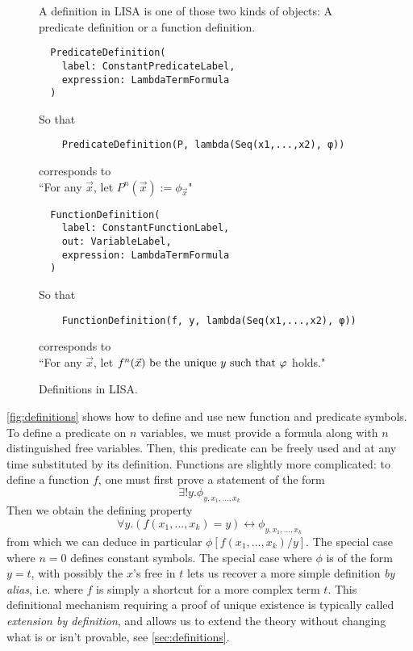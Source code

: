 \begin{figure}
  A definition in LISA is one of those two kinds of objects: A predicate definition or a function definition.
  \begin{lstlisting}
  PredicateDefinition(
    label: ConstantPredicateLabel,
    expression: LambdaTermFormula
  )
\end{lstlisting}
  So that
  \begin{lstlisting}
    PredicateDefinition(P, lambda(Seq(x1,...,x2), φ)) 
  \end{lstlisting}
  corresponds to \\
  \hspace*{1.3em}``For any $\vec{x}$, let $P^n(\vec{x}) := \phi_{\vec{x}}$"

  \vspace*{2em}
  \begin{lstlisting}
  FunctionDefinition(
    label: ConstantFunctionLabel,
    out: VariableLabel, 
    expression: LambdaTermFormula
  )
\end{lstlisting}
  So that
  \begin{lstlisting}
    FunctionDefinition(f, y, lambda(Seq(x1,...,x2), φ)) 
  \end{lstlisting}
  corresponds to \\
  \hspace*{1.3em}``For any $\vec{x}$, let $f^n(\vec{x}) \textnormal{ be the unique } y \textnormal{ such that } \varphi$ holds."

  \caption{Definitions in LISA.}
  \label{fig:definitions}
\end{figure}

\autoref{fig:definitions} shows how to define and use new function and predicate symbols. To define a predicate on $n$ variables, we must provide a formula along with $n$ distinguished free variables. Then, this predicate can be freely used and at any time substituted by its definition. Functions are slightly more complicated: to define a function $f$, one must first prove a statement of the form
$$\exists ! y. \phi_{y, x_1,...,x_k}$$
Then we obtain the defining property
$$\forall y. (f(x_1,...,x_k)=y) \leftrightarrow \phi_{y, x_1,...,x_k}$$
from which we can deduce in particular $\phi[f(x_1,...,x_k)/y]$.
The special case where $n=0$ defines constant symbols. The special case where $\phi$ is of the form $y=t$, with possibly the $x$'s free in $t$ lets us recover a more simple definition \textit{by alias}, i.e. where  $f$ is simply a shortcut for a more complex term $t$.
This definitional mechanism requiring a proof of unique existence is typically called \textit{extension by definition}, and allows us to extend the theory without changing what is or isn't provable, see \autoref{sec:definitions}.

